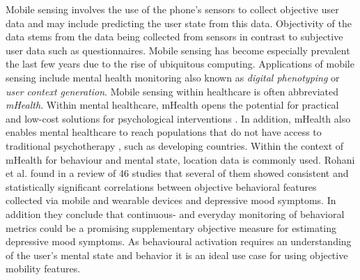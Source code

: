 Mobile sensing involves the use of the phone's sensors to collect objective user data and may include predicting the user state from this data. Objectivity of the data stems from the data being collected from sensors in contrast to subjective user data such as questionnaires. Mobile sensing has become especially prevalent the last few years due to the rise of ubiquitous computing. Applications of mobile sensing include mental health monitoring also known as \textit{digital phenotyping} or \textit{user context generation}. Mobile sensing within healthcare is often abbreviated \textit{mHealth}. Within mental healthcare, mHealth opens the potential for practical and low-cost solutions for psychological interventions \cite{mobile-based-interventions}. In addition, mHealth also enables mental healthcare to reach populations that do not have access to traditional psychotherapy \cite{future-mental-health}, such as developing countries. Within the context of mHealth for behaviour and mental state, location data is commonly used. Rohani et al. \cite{rohani2018-correlations} found in a review of 46 studies that several of them showed consistent and statistically significant correlations between objective behavioral features collected via mobile and wearable devices and depressive mood symptoms. In addition they conclude that continuous- and everyday monitoring of behavioral metrics could be a promising supplementary objective measure for estimating depressive mood symptoms. As behavioural activation requires an understanding of the user's mental state and behavior it is an ideal use case for using objective mobility features. \\


